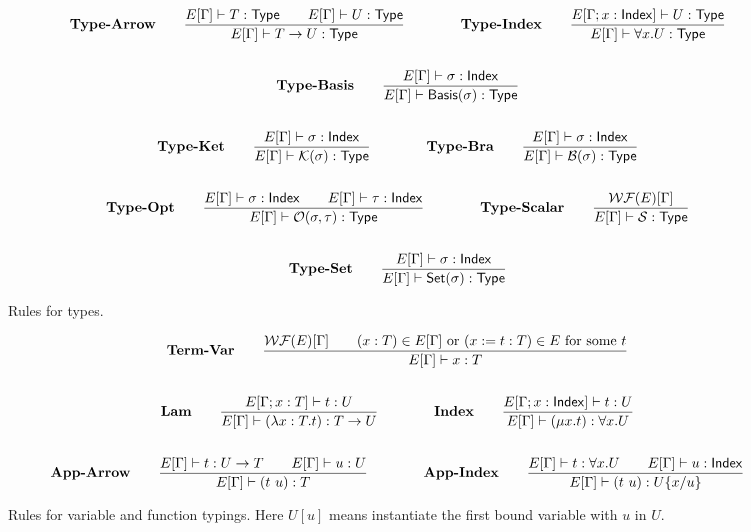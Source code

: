 \documentclass{article}
\begin{document}
\begin{figure}
    \begin{gather*}
        \textbf{Type-Arrow} \qquad
        \frac{E[\Gamma] \vdash T : \mathsf{Type} \qquad E[\Gamma] \vdash U : \mathsf{Type}}{E[\Gamma] \vdash T \to U : \mathsf{Type}}
        \qquad \qquad
        \textbf{Type-Index} \qquad
        \frac{E[\Gamma ; x : \mathsf{Index}] \vdash U : \mathsf{Type}}{E[\Gamma] \vdash \forall x.U : \mathsf{Type}} \\
        \\        
        \textbf{Type-Basis} \qquad
        \frac{E[\Gamma] \vdash \sigma : \mathsf{Index}}{E[\Gamma] \vdash \mathsf{Basis}(\sigma) : \mathsf{Type}}  \\
        \\
        \textbf{Type-Ket} \qquad
        \frac{E[\Gamma] \vdash \sigma : \mathsf{Index}}{E[\Gamma] \vdash \mathcal{K}(\sigma) : \mathsf{Type}}
        \qquad \qquad
        \textbf{Type-Bra} \qquad
        \frac{E[\Gamma] \vdash \sigma : \mathsf{Index}}{E[\Gamma] \vdash \mathcal{B}(\sigma) : \mathsf{Type}} \\
        \\
        \textbf{Type-Opt} \qquad
        \frac{E[\Gamma] \vdash \sigma : \mathsf{Index} \qquad E[\Gamma] \vdash \tau : \mathsf{Index}}{E[\Gamma] \vdash \mathcal{O}(\sigma, \tau) : \mathsf{Type}}
        \qquad \qquad
        \textbf{Type-Scalar} \qquad
        \frac{\mathcal{WF}(E)[\Gamma]}{E[\Gamma] \vdash \mathcal{S} : \mathsf{Type}} \\
        \\
        \textbf{Type-Set} \qquad
        \frac{E[\Gamma] \vdash \sigma : \mathsf{Index}}{E[\Gamma] \vdash \mathsf{Set}(\sigma) : \mathsf{Type}}
    \end{gather*}
    \caption{Rules for types.}
\end{figure}

\begin{figure}[h]
    \begin{gather*}
        \textbf{Term-Var} \qquad
        \frac{\mathcal{WF}(E)[\Gamma] \qquad (x:T) \in E[\Gamma] \text{ or } (x := t : T) \in E \text{ for some $t$}}{E[\Gamma] \vdash x : T} \\
        \\
        \textbf{Lam} \qquad
        \frac{E[\Gamma; x : T] \vdash t : U}{E[\Gamma] \vdash (\lambda x : T . t) : T \to U}
        \qquad \qquad
        \textbf{Index} \qquad
        \frac{E[\Gamma; x : \mathsf{Index}] \vdash t : U}{E[\Gamma] \vdash (\mu x.t) : \forall x.U} \\
        \\
        \textbf{App-Arrow} \qquad
        \frac{E[\Gamma] \vdash t:U \to T \qquad E[\Gamma] \vdash u:U}{E[\Gamma] \vdash (t\ u):T}
        \qquad \qquad
        \textbf{App-Index} \qquad
        \frac{E[\Gamma] \vdash t:\forall x.U \qquad E[\Gamma] \vdash u : \mathsf{Index}}{E[\Gamma] \vdash (t\ u):U\{x/u\}}
    \end{gather*}
    \caption{Rules for variable and function typings. Here $U[u]$ means instantiate the first bound variable with $u$ in $U$.}
\end{figure}
\end{document}
